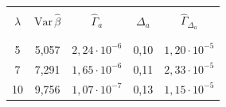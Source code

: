 \begin{table}\small %


\begin{center}


\parbox{210pt}{





}





\vspace*{2ex}





\begin{tabular}{|c|c|c|c|c|}


\hline


&&&&\\[-9pt]


$\lambda$& $\mathrm{Var}\, \hat{\beta}$ &  ${\hat\Gamma}_{a}$  & ${\Delta}_{a}$ & 


${\hat\Gamma}_{{\Delta}_{a}}$ \\ 


&&&&\\[-9pt] 


\hline


&&&&\\[-9pt]


\hphantom{9}5&5,057 & $ 2{,}24 \cdot 10^{-6}$&  0,10 & $1{,}20 \cdot 10^{-5} $\\




\hphantom{9}7&7,291&  $1{,}65 \cdot 10^{-6} $&  0,11 &$ 2{,}33 \cdot 10^{-5}$   \\




10&9,756 &$ 1{,}07 \cdot 10^{-7} $&  0,13 & $1{,}15 \cdot 10^{-5}$ \\


\hline


\end{tabular}


\end{center}


\vspace*{-12pt}


\end{table}





